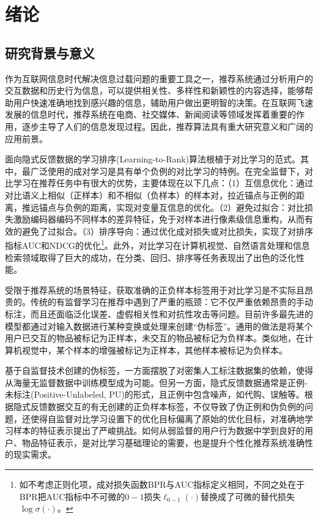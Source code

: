 
\chapter{绪论}
\label{cha:intro}

\section{研究背景与意义}\label{sec:general intro}
作为互联网信息时代解决信息过载问题的重要工具之一，推荐系统通过分析用户的交互数据和历史行为信息，可以提供相关性、多样性和新颖性的内容选择，能够帮助用户快速准确地找到感兴趣的信息，辅助用户做出更明智的决策。在互联网飞速发展的信息时代，推荐系统在电商、社交媒体、新闻阅读等领域发挥着重要的作用，逐步主导了人们的信息发现过程。因此，推荐算法具有重大研究意义和广阔的应用前景\cite{Steffen:2009:UAI,Ai:2018:SIGIR,Ding:2020:NIPS}。

面向隐式反馈数据的学习排序(Learning-to-Rank)算法根植于对比学习的范式。其中，最广泛使用的成对学习是具有单个负例的对比学习的特例。在完全监督下，对比学习在推荐任务中有很大的优势，主要体现在以下几点：（1）互信息优化：通过
对比语义上相似（正样本）和不相似（负样本）的样本对，拉近锚点与正例的距离，推远锚点与负例的距离，实现对变量互信息的优化。（2）避免过拟合：对比损失激励编码器编码不同样本的差异特征，免于对样本进行像素级信息重构，从而有效的避免了过拟合。（3）排序导向：通过优化成对损失或对比损失，实现了对排序指标AUC和NDCG的优化\footnote{如不考虑正则化项，成对损失函数BPR与AUC指标定义相同，不同之处在于BPR把AUC指标中不可微的$0-1$损失$\ell_{0-1}(\cdot)$替换成了可微的替代损失$\log\sigma(\cdot)$\cite{Steffen:2009:UAI}。}。此外，对比学习在计算机视觉、自然语言处理和信息检索领域取得了巨大的成功，在分类、回归、排序等任务表现出了出色的泛化性能。

受限于推荐系统的场景特征，获取准确的正负样本标签用于对比学习是不实际且昂贵的。传统的有监督学习在推荐中遇到了严重的瓶颈：它不仅严重依赖昂贵的手动标注，而且还面临泛化误差、虚假相关性和对抗性攻击等问题。目前许多最先进的模型都通过对输入数据进行某种变换或处理来创建“伪标签”。通用的做法是将某个用户已交互的物品被标记为正样本，未交互的物品被标记为负样本\cite{Steffen:2009:UAI,Jingtao:2019:IJCAI,Xiangnan:2020:SIGIR,Wang:2019:SIGIR}。类似地，在计算机视觉中，某个样本的增强被标记为正样本，其他样本被标记为负样本\cite{Oord:2018:arxiv,Chen:2020:ICML,He:2020:CVPR,BYOL:2020:NIPS}。

基于自监督技术创建的伪标签，一方面摆脱了对密集人工标注数据集的依赖，使得从海量无监督数据中训练模型成为可能。但另一方面，隐式反馈数据通常是正例-未标注(Positive-Unlabeled, PU)的形式，且正例中包含噪声，如代购、误触等。根据隐式反馈数据交互的有无创建的正负样本标签，不仅导致了伪正例和伪负例的问题，还使得自监督对比学习设置下的优化目标偏离了原始的优化目标，对准确地学习样本的特征表示提出了严峻挑战。如何从弱监督的用户行为数据中学到良好的用户、物品特征表示，是对比学习基础理论的需要，也是提升个性化推荐系统准确性的现实需求。


